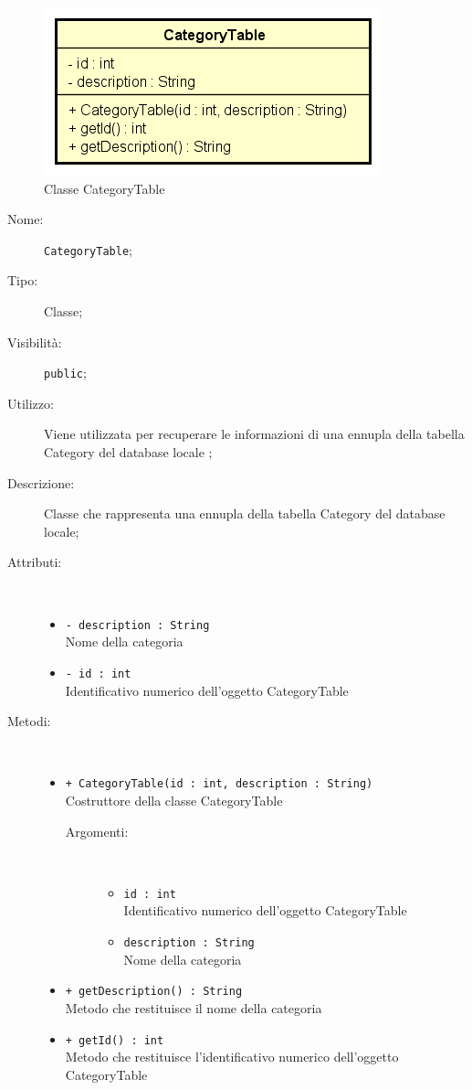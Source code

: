 \documentclass[../DefinizioneDiProdotto.tex]{subfiles}
\begin{document}
    \begin{figure}[H]
        \centering
        \includegraphics{img/CategoryTable.png}
        \caption{Classe CategoryTable}\label{fig:model::dataaccess::dao::CategoryTable} 
    \end{figure}
    \begin{description}
\item[Nome:] \texttt{CategoryTable};
\item[Tipo:] Classe;
\item[Visibilità:] \texttt{public};
\item[Utilizzo:] Viene utilizzata per recuperare le informazioni di una ennupla della tabella Category del database locale ;
\item[Descrizione:] Classe che rappresenta una ennupla della tabella Category del database locale;
\item[Attributi:] \
\begin{itemize}
\item \texttt{- description : String}\\
Nome della categoria

\item \texttt{- id : int}\\
Identificativo numerico dell'oggetto CategoryTable

\end{itemize}
\item[Metodi:] \
\begin{itemize}
\item \texttt{+ CategoryTable(id : int, description : String)}\\
Costruttore della classe CategoryTable
 \begin{description}
\item[Argomenti:] \
\begin{itemize}
\item \texttt{id : int}\\
Identificativo numerico dell'oggetto CategoryTable\item \texttt{description : String}\\
Nome della categoria\end{itemize}
\end{description}
\item \texttt{+ getDescription() : String}\\
Metodo che restituisce il nome della categoria
 \item \texttt{+ getId() : int}\\
Metodo che restituisce l'identificativo numerico dell'oggetto CategoryTable
 \end{itemize}
\end{description}
\end{document}
